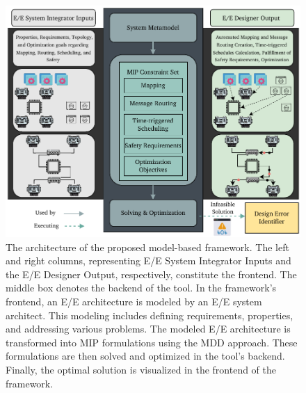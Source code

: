 
    \begin{figure}[t]
    	\centering
    	\includegraphics[width=1\textwidth]{figures/MainApproach.pdf}%
    	\caption{The architecture of the proposed model-based framework. The left and right columns, representing E/E System Integrator Inputs and the E/E Designer Output, respectively, constitute the frontend. The middle box denotes the backend of the tool. In the framework's frontend, an E/E architecture is modeled by an E/E system architect. This modeling includes defining requirements, properties, and addressing various problems. The modeled E/E architecture is transformed into MIP formulations using the MDD approach. These formulations are then solved and optimized in the tool's backend. Finally, the optimal solution is visualized in the frontend of the framework.}
    	\label{fig041}
    \end{figure}
    
    
